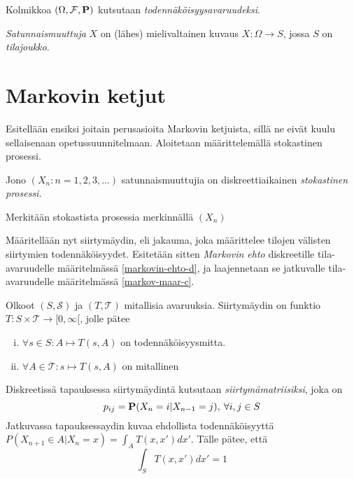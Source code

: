 \begin{maar}
	Kolmikkoa $(\Omega, \mathcal{F}, \textbf{P} )$ kutsutaan \textit{todennäköisyysavaruudeksi}.
\end{maar}

\begin{maar}
	\textit{Satunnaismuuttuja} $X$ on (lähes) mielivaltainen kuvaus $X:\Omega\rightarrow S$, jossa $S$ on \textit{tilajoukko}. 
\end{maar}



\section{Markovin ketjut}

Esitellään ensiksi joitain perusasioita Markovin ketjuista, sillä ne eivät kuulu sellaisenaan opetussuunnitelmaan. Aloitetaan määrittelemällä stokastinen prosessi.\cite{piiroinen_stokastiset_nodate}

\begin{maar}
	Jono $(X_n:n=1,2,3,...)$ satunnaismuuttujia on diskreettiaikainen \textit{stokastinen prosessi}.
\end{maar}

\begin{merk}
	Merkitään stokastista prosessia merkinnällä $( X_n )$
\end{merk}

Määritellään nyt siirtymäydin, eli jakauma, joka määrittelee tilojen välisten siirtymien todennäköisyydet. Esitetään sitten \textit{Markovin ehto} diskreetille tila-avaruudelle määritelmässä \ref{markovin-ehto-d}, ja laajennetaan se jatkuvalle tila-avaruudelle määritelmässä \ref{markov-maar-c}. \cite{monte_carlo_book}

\begin{maar}
	Olkoot $(S,\mathcal{S})$ ja $(T,\mathcal{T})$ mitallisia avaruuksia. Siirtymäydin on funktio $T:S\times \mathcal{T} \rightarrow [0,\infty[$, jolle pätee
	\begin{enumerate}[(i)]
		\item $\forall s \in S: A \mapsto T(s,A)$ on todennäköisyysmitta.
		\item $\forall A \in \mathcal{T}: s \mapsto T(s,A)$ on mitallinen
	\end{enumerate}
	Diskreetissä tapauksessa siirtymäydintä kutsutaan \textit{siirtymämatriisiksi}, joka on 
	\begin{equation}
		p_{ij} = \textbf{P}(X_n = i | X_{n-1} = j), \:\forall i,j \in S
	\end{equation}
	Jatkuvassa tapauksessaydin kuvaa ehdollista todennäköisyyttä $P(X_{n+1} \in A|X_n = x) = \int_A T(x,x')dx'$. Tälle pätee, että 
	\begin{equation}\label{siirt-tiheys}
		\int_S T(x,x')dx' = 1
	\end{equation}
\end{maar}


